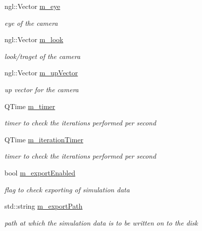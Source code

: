 \begin{DoxyCompactItemize}
ngl::Vector \hyperlink{class_g_l_window_a629e95979f0bbb5306562358ca507eb8}{m\_\-eye}
\begin{DoxyCompactList}\small\item\em eye of the camera \item\end{DoxyCompactList}\item 
ngl::Vector \hyperlink{class_g_l_window_acb8385bfb1f1fcbaafe890aabf51055b}{m\_\-look}
\begin{DoxyCompactList}\small\item\em look/traget of the camera \item\end{DoxyCompactList}\item 
ngl::Vector \hyperlink{class_g_l_window_af2d28904bf4682c2f0cc2ab552f6ae8c}{m\_\-upVector}
\begin{DoxyCompactList}\small\item\em up vector for the camera \item\end{DoxyCompactList}\item 
QTime \hyperlink{class_g_l_window_abc5b1376741572d8c02860eafbfd008c}{m\_\-timer}
\begin{DoxyCompactList}\small\item\em timer to check the iterations performed per second \item\end{DoxyCompactList}\item 
QTime \hyperlink{class_g_l_window_aba81e4d4f6b0cece757626a9a23f3415}{m\_\-iterationTimer}
\begin{DoxyCompactList}\small\item\em timer to check the iterations performed per second \item\end{DoxyCompactList}\item 
bool \hyperlink{class_g_l_window_a0919598c4a7cd0726423a0751ef9b193}{m\_\-exportEnabled}
\begin{DoxyCompactList}\small\item\em flag to check exporting of simulation data \item\end{DoxyCompactList}\item 
std::string \hyperlink{class_g_l_window_a9beaa5fbadec281cd162d6ad0e792e94}{m\_\-exportPath}
\begin{DoxyCompactList}\small\item\em path at which the simulation data is to be written on to the disk \item\end{DoxyCompactList}\item 

\end{DoxyCompactItemize}
